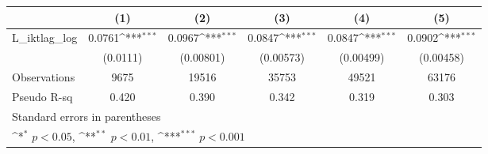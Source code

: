 {
\def\sym#1{\ifmmode^{#1}\else\(^{#1}\)\fi}
\begin{tabular}{l*{5}{c}}
\hline\hline
                &\multicolumn{1}{c}{(1)}         &\multicolumn{1}{c}{(2)}         &\multicolumn{1}{c}{(3)}         &\multicolumn{1}{c}{(4)}         &\multicolumn{1}{c}{(5)}         \\
\hline
L\_iktlag\_log    &   0.0761\sym{***}&   0.0967\sym{***}&   0.0847\sym{***}&   0.0847\sym{***}&   0.0902\sym{***}\\
                & (0.0111)         &(0.00801)         &(0.00573)         &(0.00499)         &(0.00458)         \\
\hline
Observations    &     9675         &    19516         &    35753         &    49521         &    63176         \\
Pseudo R-sq     &    0.420         &    0.390         &    0.342         &    0.319         &    0.303         \\
\hline\hline
\multicolumn{6}{l}{\footnotesize Standard errors in parentheses}\\
\multicolumn{6}{l}{\footnotesize \sym{*} \(p<0.05\), \sym{**} \(p<0.01\), \sym{***} \(p<0.001\)}\\
\end{tabular}
}
